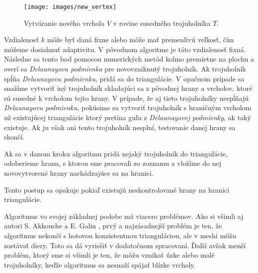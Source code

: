 \begin{figure}
    \centerline{\texttt{[image: images/new\_vertex]}}
    \caption[Vytváranie nového vrchola]
    {Vytváranie nového vrchola $V$ v rovine susedného trojuholníka $T$.}
    \label{obr:new_vertex}
\end{figure}

Vzdialenosť $k$ môže byť daná fixne alebo môže mať premenlivú veľkosť, čím môžeme dosiahnuť adaptivitu.
V pôvodnom algoritme je táto vzdialenosť fixná. 
Následne sa tento bod pomocou numerických metód kolmo premietne na plochu a overí sa 
\textit{Delaunayova podmienka} pre novovzniknutý trojuholník. 
Ak trojuholník spĺňa \textit{Delaunayovu podmienku}, pridá sa do triangulácie. V opačnom prípade sa snažíme 
vytvoriť iný trojuholník skladajúci sa z pôvodnej hrany a vrcholov, ktoré sú susedné k vrcholom tejto hrany. 
V prípade, že aj tieto trojuholníky nespĺňajú \textit{Delaunayovu podmienku}, pokúsime sa vytvoriť 
trojuholník s hraničným vrcholom už existujúcej triangulácie ktorý pretína guľu z 
\textit{Delaunayovej podmienky}, ak taký existuje. Ak ju však ani tento trojuholník nesplní, 
testovanie danej hrany sa skončí.

Ak sa v danom kroku algoritmu pridá nejaký trojuholník do triangulácie, odoberieme hranu, 
s ktorou sme pracovali zo zoznamu a vložíme do nej novovytvorené hrany nachádzajúce sa na hranici.

Tento postup sa opakuje pokiaľ existujú neskontrolované hrany na hranici triangulácie.

Algoritmus vo svojej základnej podobe má viacero problémov. Ako si všimli aj autori S. Akkouche 
a E. Galin \cite{akkouche2001adaptive}, prvý a najzásadnejší problém je ten,
že algoritmus nekončí s hotovou konzistentnou trianguláciou, ale v meshi môžu zostávať diery. Toto sa
dá vyriešiť v dodatočnom spracovaní. Ďalší avšak menší problém, ktorý sme si všimli
je ten, že môžu vznikať úzke alebo malé trojuholníky, keďže algoritmus sa nesnaží spájať blízke vrcholy.

